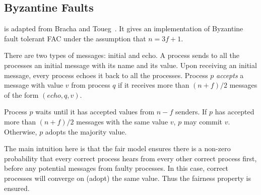 \subsection{Byzantine Faults}

 is adapted from Bracha and Toueg~\cite{BrachaT85}. It gives an implementation of Byzantine fault tolerant FAC under the assumption that $n=3f+1$.

There are two types of messages: initial and echo. A process sends to all the processes an initial message with its name and its value. Upon receiving an initial message, every process echoes it back to all the processes. Process $p$ \textit{accepts} a message with value $v$ from process $q$ if it receives more than $(n + f)/2$ messages of the form $(echo, q, v)$. 

Process $p$ waits until it has accepted values from $n-f$ senders. If $p$ has accepted more than $(n+f)/2$ messages with the same value $v$, $p$ may commit $v$. Otherwise, $p$ adopts the majority value.

The main intuition here is that the fair model ensures there is a non-zero probability that every correct process hears from every other correct process first, before any potential messages from faulty processes. In this case, correct processes will converge on (adopt) the same value. Thus the fairness property is ensured. 

